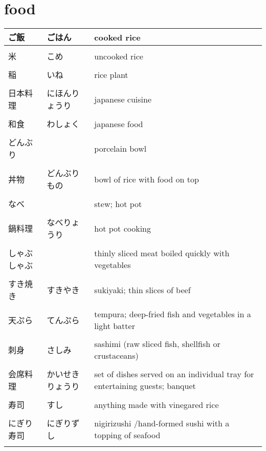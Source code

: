 \documentclass{article}
\newcommand\tabni[1][0.2cm]{\hspace*{#1}}
\begin{document}
\section{ \tabni food}
\begin{tabular}{ l | l | p{11.5cm} } %
ご飯		&ごはん   	&cooked rice \\ \hline \\[-1em]
米		&こめ       	&uncooked rice \\ \hline \\[-1em]
稲		&いね      	&rice plant \\ \hline \\[-1em]
日本料理 	&にほんりょうり 	&japanese cuisine \\ \hline \\[-1em]
和食		&わしょく  		&japanese food \\ \hline \\[-1em]
どんぶり  	&    		&porcelain bowl \\ \hline \\[-1em]
丼物  	&どんぶりもの  	&bowl of rice with food on top \\ \hline \\[-1em]
なべ  	&    	  	&stew; hot pot \\ \hline \\[-1em]
鍋料理  	&なべりょうり 	&hot pot cooking \\ \hline \\[-1em]
しゃぶしゃぶ	&        	&thinly sliced meat boiled quickly with vegetables \\ \hline \\[-1em]
すき焼き	&すきやき    	&sukiyaki; thin slices of beef \\ \hline \\[-1em]
天ぷら 	&てんぷら   	&tempura; deep-fried fish and vegetables in a light batter \\ \hline \\[-1em]
刺身   	&さしみ       	&sashimi (raw sliced fish, shellfish or crustaceans) \\ \hline \\[-1em]
会席料理 	&かいせきりょうり 	&set of dishes served on an individual tray for entertaining guests; banquet \\ \hline \\[-1em]
寿司   	&すし       	&anything made with vinegared rice \\ \hline \\[-1em]
にぎり寿司 	&にぎりずし   	&nigirizushi /hand-formed sushi with a topping of seafood \\ \hline \\[-1em]

\end{tabular}
\end{document}
